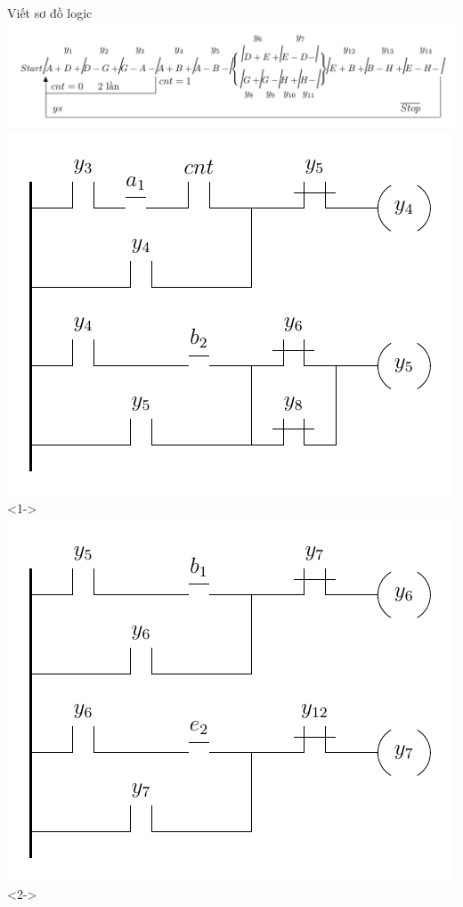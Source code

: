\documentclass[24pt]{beamer}
\begin{document}
\begin{frame}[plain]{Viết sơ đồ logic}
	\vspace{-.5cm}
	\hspace{-1cm}\includegraphics[scale=0.7]{draw-tikz/quatrinh-bt4-buoc1-gomnhom.pdf}\\

	\includegraphics[scale=0.6]{draw-tikz/quatrinh-bt4-buoc2-sodologic-b3.pdf}<1->
	\hspace{0.5cm}\includegraphics[scale=0.6]{draw-tikz/quatrinh-bt4-buoc2-sodologic-b4.pdf}<2->
\end{frame}
\end{document}
